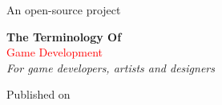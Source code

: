 \begin{titlepage} %

	\raggedleft %
	
	\vspace*{\baselineskip} %
	
	
	{\Large An open-source project}
	
	\vspace*{0.167\textheight} %
	
	
	\textbf{\LARGE The Terminology Of}\\[\baselineskip]
	
	{\textcolor{Red}{\Huge Game Development}}\\[\baselineskip]
	
	{\Large \textit{For game developers, artists and designers}}
	
	\vfill
	
	
	{\large Published on ~~\plogo} %
	
	\vspace*{3\baselineskip} %

\end{titlepage}